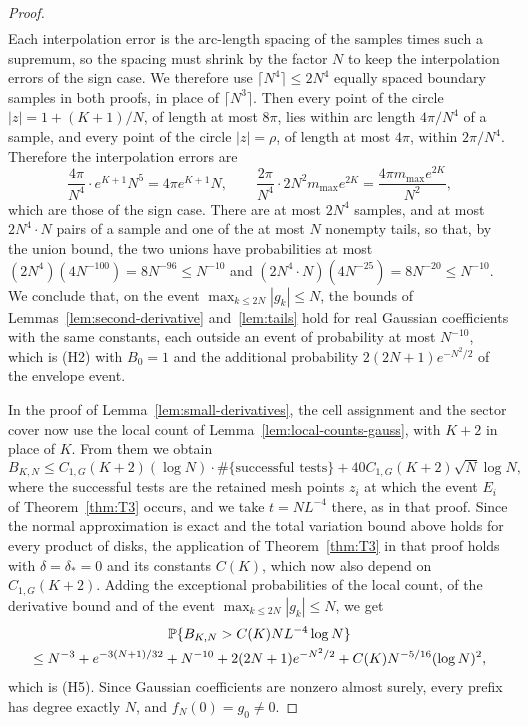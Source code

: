 \begin{proof}
\begin{align*}
\end{align*}
Each interpolation error is the arc-length spacing of the samples times
such a supremum, so the spacing must shrink by the factor $N$ to keep
the interpolation errors of the sign case.
We therefore use $\lceil N^4\rceil\le2N^4$ equally spaced boundary samples
in both proofs, in place of $\lceil N^3\rceil$.
Then every point of the circle $|z|=1+(K+1)/N$, of length at most
$8\pi$, lies within arc length $4\pi/N^4$ of a sample, and every point of
the circle $|z|=\rho$, of length at most $4\pi$, within $2\pi/N^4$.
Therefore the interpolation errors are
\[
 \frac{4\pi}{N^4}\cdot e^{K+1}N^5=4\pi e^{K+1}N,\qquad
 \frac{2\pi}{N^4}\cdot2N^2m_{\max}e^{2K}=\frac{4\pi m_{\max}e^{2K}}{N^2},
\]
which are those of the sign case.
There are at most $2N^4$ samples, and at most $2N^4\cdot N$ pairs of a
sample and one of the at most $N$ nonempty tails, so that, by the union
bound, the two unions have probabilities at most
$(2N^4)(4N^{-100})=8N^{-96}\le N^{-10}$ and
$(2N^4\cdot N)(4N^{-25})=8N^{-20}\le N^{-10}$.
We conclude that, on the event $\max_{k\le2N}|g_k|\le N$, the bounds of
Lemmas~\ref{lem:second-derivative} and~\ref{lem:tails} hold for real
Gaussian coefficients with the same constants, each outside an event of
probability at most $N^{-10}$, which is (H2) with $B_0=1$ and the
additional probability $2(2N+1)e^{-N^2/2}$ of the envelope event.

In the proof of Lemma~\ref{lem:small-derivatives}, the cell assignment
and the sector cover now use the local count of
Lemma~\ref{lem:local-counts-gauss}, with $K+2$ in place of $K$.
From them we obtain
\[
 B_{K,N}\le C_{1,G}(K+2)(\log N)\cdot\#\{\text{successful tests}\}
 +40C_{1,G}(K+2)\sqrt N\log N,
\]
where the successful tests are the retained mesh points $z_i$ at which
the event $E_i$ of Theorem~\ref{thm:T3} occurs, and we take $t=NL^{-4}$
there, as in that proof.
Since the normal approximation is exact and the total variation bound
above holds for every product of disks, the application of
Theorem~\ref{thm:T3} in that proof holds with $\delta=\delta_*=0$ and its
constants $C(K)$, which now also depend on $C_{1,G}(K+2)$.
Adding the exceptional probabilities of the local count, of the
derivative bound and of the event $\max_{k\le2N}|g_k|\le N$, we get
\begin{multline}
 \mathbb P\{B_{K,N}>C(K)NL^{-4}\log N\}\\
 \le N^{-3}+e^{-3(N+1)/32}+N^{-10}+2(2N+1)e^{-N^2/2}
 +C(K)N^{-5/16}(\log N)^2,
 \label{eq:gauss-small-derivatives}
\end{multline}
which is (H5).
Since Gaussian coefficients are nonzero almost surely, every prefix has
degree exactly $N$, and $f_N(0)=g_0\ne0$.


\end{proof}
